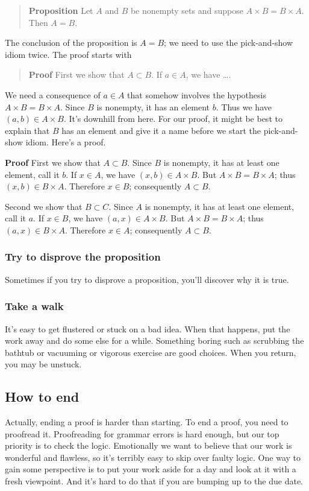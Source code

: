 \documentclass[12pt,fleqn]{article}
\newcounter{ex}\setcounter{ex}{0}
\newcounter{id}\setcounter{id}{0}
\newcounter{se}\setcounter{se}{0}
\begin{document}
\begin{quote}
\textbf{Proposition} Let \(A\) and \(B\) be nonempty sets and suppose \mbox{\(A \times B
= B \times A\)}.  Then \(A = B\).
\end{quote}
The conclusion of the proposition is \(A = B\); we need to use the 
pick-and-show idiom twice. The proof starts with
\begin{quote}
 \textbf{Proof}  First we show that \(A \subset B\). If \(a \in A\), we have \dots. 
\end{quote}
We need a consequence of \(a \in A\) that somehow involves the
hypothesis \mbox{\(A \times B = B \times A\)}.  Since \(B\) is
nonempty, it has an element \(b\). Thus we have \((a,b) \in A \times
B\).  It's downhill from here. For our proof, it might be best to
explain that \(B\) has an element and give it a name before we start
the pick-and-show idiom.  Here's a proof.




 \textbf{Proof} First we show that \(A \subset B\). Since \(B\) is
 nonempty, it has at least one element, call it \(b\). If \(x \in A\), we
 have \((x,b) \in A \times B\).  But \mbox{\(A \times B = B \times A\)};
 thus \((x,b) \in B \times A\).  Therefore \(x \in B\); consequently
\(A \subset B\).

Second we show that \(B \subset C\).  Since \(A\) is
 nonempty, it has at least one element, call it \(a\). If \(x \in B\), we
 have \((a,x) \in A \times B\).  But \(A \times B = B \times A\);
 thus \((a,x) \in B \times A\).  Therefore \(x \in A\); consequently
\(A \subset B\).

\subsubsection{Try to disprove the proposition} 
 
 Sometimes if you try to disprove a proposition, you'll discover why
 it is true.
 
 \subsubsection{Take a walk}  It's easy to get flustered or stuck on a bad idea.  When that happens,
 put the work away and do some else for a while. Something boring such as
 scrubbing the bathtub or vacuuming or vigorous exercise are good choices.
  When you return, you may be unstuck.

\subsection{How to end}

Actually, ending a proof is harder than starting. To end a proof, you need to proofread it.  Proofreading for grammar 
errors is hard enough, but our top priority is to check the logic. Emotionally we want to believe that our work is wonderful
and flawless, so it's terribly easy to skip over faulty logic.  One way to gain some perspective is to put your work aside for 
a day and look at it with a fresh viewpoint.  And it's hard to do that if you are bumping up to the due date.
\end{document}
